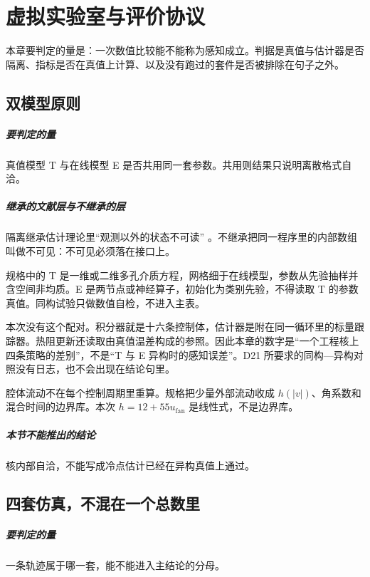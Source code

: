 \chapter{虚拟实验室与评价协议}
\label{ch:sim}

本章要判定的量是：一次数值比较能不能称为感知成立。判据是真值与估计器是否隔离、指标是否在真值上计算、以及没有跑过的套件是否被排除在句子之外。

\section{双模型原则}

\paragraph{要判定的量}
真值模型 T 与在线模型 E 是否共用同一套参数。共用则结果只说明离散格式自洽。

\paragraph{继承的文献层与不继承的层}
隔离继承估计理论里“观测以外的状态不可读” \cite{ozisik2000,evensen2003}。不继承把同一程序里的内部数组叫做不可见：不可见必须落在接口上。

规格中的 T 是一维或二维多孔介质方程，网格细于在线模型，参数从先验抽样并含空间非均质。E 是两节点或神经算子，初始化为类别先验，不得读取 T 的参数真值。同构试验只做数值自检，不进入主表。

本次没有这个配对。积分器就是十六条控制体，估计器是附在同一循环里的标量跟踪器。热阻更新还读取由真值温差构成的参照。因此本章的数字是“一个工程核上四条策略的差别”，不是“T 与 E 异构时的感知误差”。D21 所要求的同构—异构对照没有日志，也不会出现在结论句里。

腔体流动不在每个控制周期里重算。规格把少量外部流动收成 \(h(|v|)\)、角系数和混合时间的边界库。本次 \(h=12+55u_{\mathrm{fan}}\) 是线性式，不是边界库。

\paragraph{本节不能推出的结论}
核内部自洽，不能写成冷点估计已经在异构真值上通过。

\section{四套仿真，不混在一个总数里}

\paragraph{要判定的量}
一条轨迹属于哪一套，能不能进入主结论的分母。

